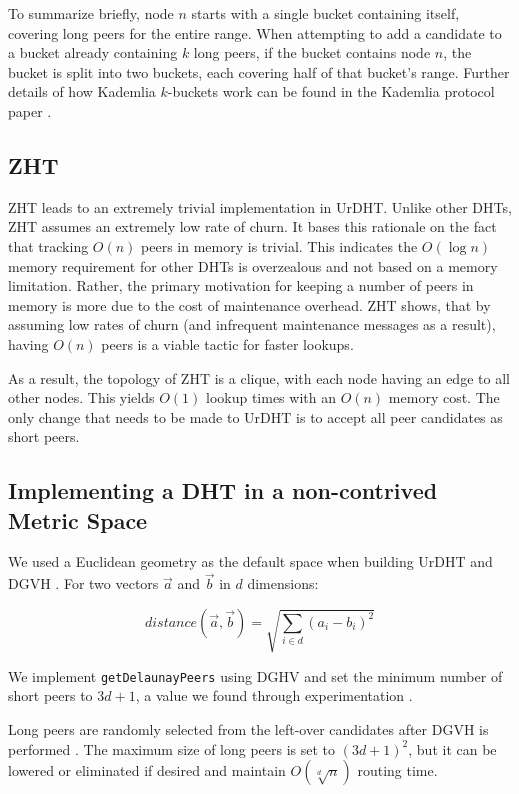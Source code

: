 \documentclass[11pt,conference]{IEEEtran}
\begin{document}
To summarize briefly, node $n$ starts with a single bucket containing itself, covering long peers for the entire range.
When attempting to add a candidate to a bucket already containing $k$ long peers, if the bucket contains node $n$, the bucket is split into two buckets, each covering half of that bucket's range.
Further details of how Kademlia $k$-buckets work can be found in the Kademlia protocol paper \cite{kademlia}.


\subsection{ZHT}
ZHT \cite{li2013zht} leads to an extremely trivial implementation in UrDHT.
Unlike other DHTs, ZHT assumes an extremely low rate of churn.
It bases this rationale on the fact that tracking $ O(n) $ peers in memory is trivial.
This indicates the $ O( \log n)  $  memory  requirement for other DHTs is overzealous and not based on a memory limitation.
Rather, the primary motivation for keeping a number of peers in memory is more due to the cost of maintenance overhead.
ZHT shows, that by assuming low rates of churn (and infrequent maintenance messages as a result), having $O(n)$ peers is a viable tactic for faster lookups.

As a result, the topology of ZHT is a clique, with each node having an edge to all other nodes.
This yields $ O(1) $ lookup times with an $ O(n) $ memory cost.
The only change that needs to be made to UrDHT is to accept all peer candidates as short peers.

\subsection{Implementing a DHT in a non-contrived Metric Space}

We used a Euclidean geometry as the default space when building UrDHT and DGVH \cite{dgvh}.
For two vectors $\vec{a}$ and $\vec{b}$ in $d$ dimensions: 

\[distance\left(\vec{a}, \vec{b}\right) = \sqrt{\sum\limits_{i\in d} \left(a_i-b_i\right)^2}\]


We implement \texttt{getDelaunayPeers} using DGHV and set the minimum number of short peers to $3d+1$, a value we found through experimentation \cite{dgvh}.

Long peers are randomly selected from the left-over candidates after DGVH is performed \cite{dgvh}.
The maximum size of long peers is set to $(3d+1)^2$, but it can be lowered or eliminated if desired and maintain $ O(\sqrt[d]{n}) $ routing time.
\end{document}
